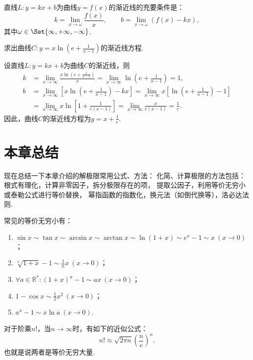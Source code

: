 \begin{theorem}
直线\(L: y = kx+b\)为曲线\(y = f(x)\)的渐近线的充要条件是：\[
	k = \lim\limits_{x\to\omega} \frac{f(x)}{x},
	\qquad
	b = \lim\limits_{x\to\omega} (f(x) - kx),
\]
其中\(\omega\in\Set{\infty,+\infty,-\infty}\).
\end{theorem}

\begin{example}
求出曲线\(C: y = x \ln\left(e+\frac{1}{x-1}\right)\)的渐近线方程.
\begin{solution}
设直线\(L: y = kx+b\)为曲线\(C\)的渐近线，则\begin{align*}
	k &= \lim\limits_{x\to\infty} \frac{x \ln\left(e+\frac{1}{x-1}\right)}{x}
	= \lim\limits_{x\to\infty} \ln\left(e+\frac{1}{x-1}\right)
	= 1, \\
	b &= \lim\limits_{x\to\infty} \left[ x \ln\left(e+\frac{1}{x-1}\right) - kx \right]
	= \lim\limits_{x\to\infty} x \left[ \ln\left(e+\frac{1}{x-1}\right) - 1 \right] \\
	&= \lim\limits_{x\to\infty} x \ln\left[1+\frac{1}{e(x-1)}\right]
	= \lim\limits_{x\to\infty} \frac{x}{e(x-1)}
	= \frac{1}{e}.
\end{align*}
因此，曲线\(C\)的渐近线方程为\(y = x + \frac{1}{e}\).
\end{solution}
\end{example}

\section{本章总结}
现在总结一下本章介绍的解极限常用公式、方法：
化简、计算极限的方法包括：
根式有理化，计算非零因子，拆分极限存在的项，
提取公因子，利用等价无穷小或泰勒公式进行等价替换，
幂指函数的指数化，换元法（如倒代换等），洛必达法则.

常见的等价无穷小有：
\begin{enumerate}
	\item \(\sin x \sim \tan x \sim \arcsin x \sim \arctan x \sim \ln(1+x) \sim e^x-1 \sim x\ (x\to0)\)；
	\item \(\sqrt[n]{1+x} - 1 \sim \frac{1}{n} x\ (x\to0)\)；
	\item \(\forall a\in\mathbb{R}^*: (1+x)^a-1 \sim ax\ (x\to0)\)；
	\item \(1 - \cos x \sim \frac{1}{2} x^2\ (x\to0)\)；
	\item \(a^x - 1 \sim x \ln a\ (x\to0)\).
\end{enumerate}

\begin{theorem}[斯特林公式]\label{theorem:极限.斯特林公式}
对于阶乘\(n!\)，当\(n\to\infty\)时，有如下的近似公式：\[
n! \approx \sqrt{2 \pi n} \left( \frac{n}{e} \right)^n.
\]也就是说两者是等价无穷大量.
\end{theorem}

